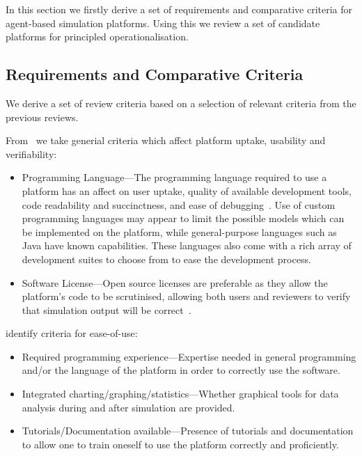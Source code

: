 In this section we firstly derive a set of requirements and comparative criteria for agent-based simulation platforms. Using this we review a set of candidate platforms for principled operationalisation. 

\subsection{Requirements and Comparative Criteria}\label{sec:p2:reviewcritera}

We derive a set of review criteria based on a selection of relevant criteria from the previous reviews.

From~\citet{CynthiaNikolaiandGregoryMadey2009} we take generial criteria which affect platform uptake, usability and verifiability:

\begin{itemize}
\item Programming Language---The programming language required to use a platform has an affect on user uptake, quality of available development tools, code readability and succinctness, and ease of debugging~\citep{Railsback2006}. Use of custom programming languages may appear to limit the possible models which can be implemented on the platform, while general-purpose languages such as Java have known capabilities. These languages also come with a rich array of development suites to choose from to ease the development process.
\item Software License---Open source licenses are preferable as they allow the platform's code to be scrutinised, allowing both users and reviewers to verify that simulation output will be correct~\citep{Polhill2007}.
\end{itemize}

\citet{Castle2006} identify criteria for ease-of-use:

\begin{itemize}
\item Required programming experience---Expertise needed in general programming and/or the language of the platform in order to correctly use the software.
\item Integrated charting/graphing/statistics---Whether graphical tools for data analysis during and after simulation are provided.
\item Tutorials/Documentation available---Presence of tutorials and documentation to allow one to train oneself to use the platform correctly and proficiently.
\end{itemize}

